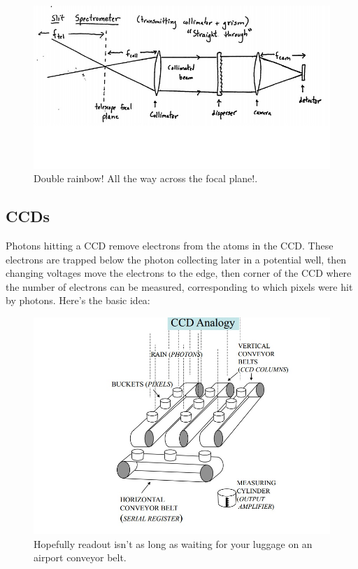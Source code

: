 \begin{figure}[!h]
\begin{center}
\includegraphics[width=\textwidth]{spectrograph.jpg}
\end{center}
\caption{Double rainbow!  All the way across the focal plane!.
\label{fig:spectrograph}}
\end{figure}


\subsection{CCDs}
Photons hitting a CCD remove electrons from the atoms in the CCD.  These 
electrons are trapped below the photon collecting later in a potential well, 
then changing voltages move the electrons to the edge, then corner of the 
CCD where the number of electrons can be measured, corresponding to which 
pixels were hit by photons.  Here's the basic idea:

\begin{figure}[!h]
\begin{center}
\includegraphics[width=\textwidth]{CCD.jpg}
\end{center}
\caption{Hopefully readout isn't as long as waiting for your luggage on an 
airport conveyor belt.
\label{fig:CCD}}
\end{figure}

